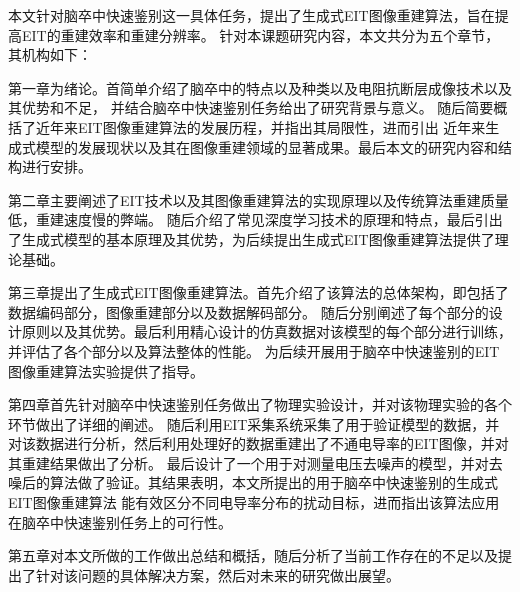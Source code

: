 
本文针对脑卒中快速鉴别这一具体任务，提出了生成式EIT图像重建算法，旨在提高EIT的重建效率和重建分辨率。
针对本课题研究内容，本文共分为五个章节，其机构如下：

第一章为绪论。首简单介绍了脑卒中的特点以及种类以及电阻抗断层成像技术以及其优势和不足，
并结合脑卒中快速鉴别任务给出了研究背景与意义。 随后简要概括了近年来EIT图像重建算法的发展历程，并指出其局限性，进而引出
近年来生成式模型的发展现状以及其在图像重建领域的显著成果。最后本文的研究内容和结构进行安排。

第二章主要阐述了EIT技术以及其图像重建算法的实现原理以及传统算法重建质量低，重建速度慢的弊端。
随后介绍了常见深度学习技术的原理和特点，最后引出了生成式模型的基本原理及其优势，为后续提出生成式EIT图像重建算法提供了理论基础。

第三章提出了生成式EIT图像重建算法。首先介绍了该算法的总体架构，即包括了数据编码部分，图像重建部分以及数据解码部分。
随后分别阐述了每个部分的设计原则以及其优势。最后利用精心设计的仿真数据对该模型的每个部分进行训练，并评估了各个部分以及算法整体的性能。
为后续开展用于脑卒中快速鉴别的EIT图像重建算法实验提供了指导。

第四章首先针对脑卒中快速鉴别任务做出了物理实验设计，并对该物理实验的各个环节做出了详细的阐述。
随后利用EIT采集系统采集了用于验证模型的数据，并对该数据进行分析，然后利用处理好的数据重建出了不通电导率的EIT图像，并对其重建结果做出了分析。
最后设计了一个用于对测量电压去噪声的模型，并对去噪后的算法做了验证。其结果表明，本文所提出的用于脑卒中快速鉴别的生成式EIT图像重建算法
能有效区分不同电导率分布的扰动目标，进而指出该算法应用在脑卒中快速鉴别任务上的可行性。

第五章对本文所做的工作做出总结和概括，随后分析了当前工作存在的不足以及提出了针对该问题的具体解决方案，然后对未来的研究做出展望。